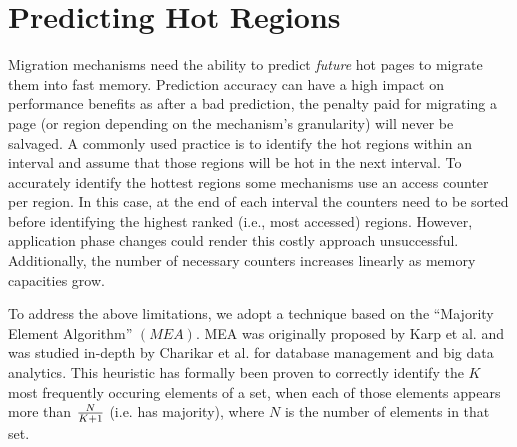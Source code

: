 
\section{Predicting Hot Regions}
\label{sec:MEA}


Migration mechanisms need the ability to predict \textit{future} hot pages to migrate them into fast memory. Prediction accuracy can have a high impact on performance benefits as after a bad prediction, the penalty paid for migrating a page (or region depending on the mechanism's granularity) will never be salvaged. A commonly used practice is to identify the hot regions within an interval and assume that those regions will be hot in the next interval. To accurately identify the hottest regions some mechanisms use an access counter per region. In this case, at the end of each interval the counters need to be sorted before identifying the highest ranked (i.e., most accessed) regions. However, application phase changes could render this costly approach unsuccessful. Additionally, the number of necessary counters increases linearly as memory capacities grow.

To address the above limitations, we adopt a technique based on the ``Majority Element Algorithm'' $(MEA)$. MEA was originally proposed by Karp et al. \cite{karp-mea} and was studied in-depth by Charikar et al. \cite{charikar-mea} for database management and big data analytics. This heuristic has formally been proven to correctly identify the $K$ most frequently occuring elements of a set, when each of those elements appears more than $N \over K+1$ (i.e. has majority), where $N$ is the number of elements in that set. 


